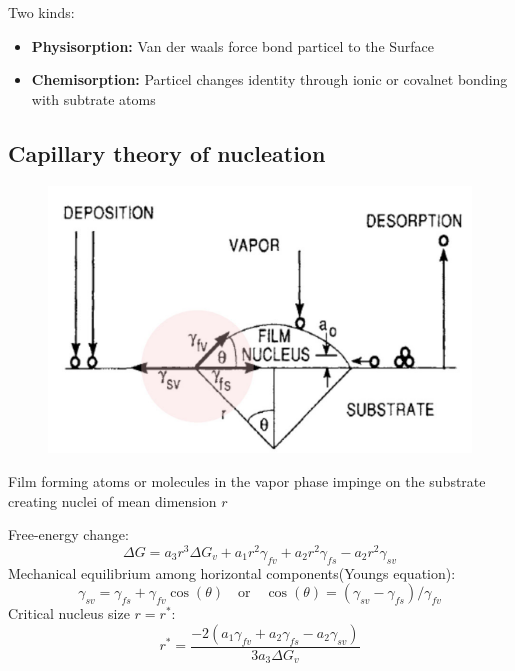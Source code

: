 Two kinds:
\begin{itemize}
    \item \textbf{Physisorption:} Van der waals force bond particel to the Surface
    \item \textbf{Chemisorption:} Particel changes identity through ionic or covalnet bonding with subtrate atoms
\end{itemize}

\subsection{Capillary theory of nucleation}
\begin{figure}[h]
    \centering
    \includegraphics[width=0.7\columnwidth]{images/nucleation.png}
    \label{fig:nucleation}
\end{figure}
Film forming atoms or molecules in the vapor phase impinge on the substrate creating nuclei of mean dimension \(r\)

Free-energy change:
\[
\Delta G = a_3 r^3 \Delta G_v + a_1 r^2 \gamma_{fv} + a_2 r^2 \gamma_{fs} - a_2 r^2 \gamma_{sv}
\]
Mechanical equilibrium among horizontal components(Youngs equation):
\[
\gamma_{sv} = \gamma_{fs} + \gamma_{fv} \cos(\theta)\quad\text{or}\quad \cos(\theta) = (\gamma_{sv} -\gamma_{fs})/\gamma_{fv}
\]
Critical nucleus size \(r = r^*\):
\[
r^* = \frac{-2(a_1 \gamma_{fv}+a_2 \gamma_{fs} - a_2 \gamma_{sv})}{3 a_3 \Delta G_v}
\]
